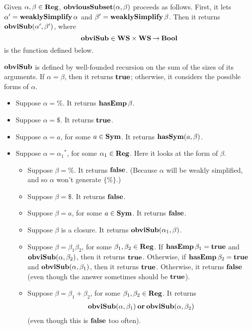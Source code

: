 Given $\alpha,\beta\in\mathbf{Reg}$, $\mathbf{obviousSubset}(\alpha,\beta)$ proceeds
as follows.  First, it lets $\alpha'=\mathbf{weaklySimplify}\,\alpha$ and
$\beta'=\mathbf{weaklySimplify}\,\beta$.  Then it returns
$\mathbf{obviSub}(\alpha',\beta')$, where
\begin{displaymath}
\mathbf{obviSub}\in\mathbf{WS}\times\mathbf{WS}\mathbin{\to}\mathbf{Bool}
\end{displaymath}
is the function defined below.

$\mathbf{obviSub}$ is defined by well-founded recursion on the sum of the
sizes of its arguments.  If $\alpha=\beta$, then it returns $\mathbf{true}$;
otherwise, it considers the possible forms of $\alpha$.
\begin{itemize}
\item Suppose $\alpha = \%$. It returns $\mathbf{hasEmp}\,\beta$.

\item Suppose $\alpha = \$$. It returns $\mathbf{true}$.

\item Suppose $\alpha = a$, for some $a\in\mathbf{Sym}$. It returns $\mathbf{hasSym}(a,
  \beta)$.

\item Suppose $\alpha = {\alpha_1}^*$, for some $\alpha_1\in\mathbf{Reg}$.
Here it looks at the form of $\beta$.
\begin{itemize}
\item Suppose $\beta = \%$. It returns $\mathbf{false}$.  (Because
$\alpha$ will be weakly simplified, and so $\alpha$ won't generate
$\{\%\}$.)

\item Suppose $\beta = \$$. It returns $\mathbf{false}$.

\item Suppose $\beta = a$, for some $a\in\mathbf{Sym}$. It returns $\mathbf{false}$.

\item Suppose $\beta$ is a closure.  It returns $\mathbf{obviSub}(\alpha_1, \beta)$.

\item Suppose $\beta=\beta_1\beta_2$, for some $\beta_1,\beta_2\in\mathbf{Reg}$.
If $\mathbf{hasEmp}\,\beta_1=\mathbf{true}$ and $\mathbf{obviSub}(\alpha,\beta_2)$,
then it returns $\mathbf{true}$.
Otherwise, if $\mathbf{hasEmp}\,\beta_2=\mathbf{true}$ and $\mathbf{obviSub}(\alpha,\beta_1)$,
then it returns $\mathbf{true}$.
Otherwise, it returns $\mathbf{false}$ (even though the answer sometimes
should be $\mathbf{true}$).

\item Suppose $\beta = \beta_1 + \beta_2$, for some $\beta_1,\beta_2\in\mathbf{Reg}$.
It returns
\begin{gather*}
\mathbf{obviSub}(\alpha, \beta_1) \mathbin{\mathbf{or}} \mathbf{obviSub}(\alpha, \beta_2)
\end{gather*}
(even though this is $\mathbf{false}$ too often).
\end{itemize}


\end{itemize}
